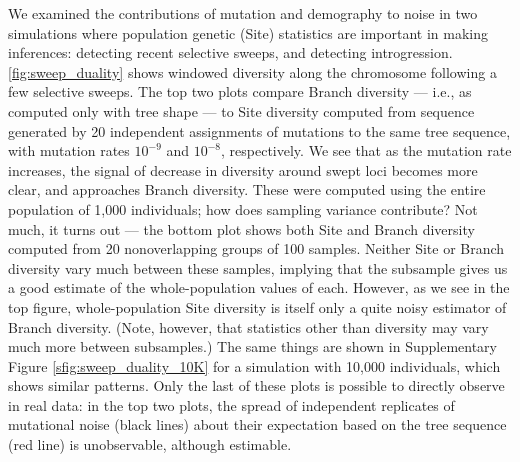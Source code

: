 \documentclass{article}
\begin{document}
We examined the contributions of mutation and demography to noise
in two simulations where population genetic (Site) statistics
are important in making inferences:
detecting recent selective sweeps,
and detecting introgression.
\autoref{fig:sweep_duality} shows windowed
diversity along the chromosome following a few selective sweeps.
The top two plots compare Branch diversity --- i.e., as computed only with tree shape ---
to Site diversity computed from sequence generated by 20 independent assignments of mutations to the same tree sequence,
with mutation rates $10^{-9}$ and $10^{-8}$, respectively.
We see that as the mutation rate increases, the signal of decrease in diversity around swept loci becomes more clear,
and approaches Branch diversity.
These were computed using the entire population of 1,000 individuals;
how does sampling variance contribute?
Not much, it turns out --- the bottom plot shows both Site and Branch diversity
computed from 20 nonoverlapping groups of 100 samples.
Neither Site or Branch diversity vary much between these samples,
implying that the subsample gives us a good estimate of the whole-population values of each.
However, as we see in the top figure,
whole-population Site diversity is itself only a quite noisy estimator of Branch diversity.
(Note, however, that statistics other than diversity may vary much more between subsamples.)
The same things are shown in Supplementary Figure \ref{sfig:sweep_duality_10K}
for a simulation with 10,000 individuals, which shows similar patterns.
Only the last of these plots is possible to directly observe in real data:
in the top two plots,
the spread of independent replicates of mutational noise (black lines)
about their expectation based on the tree sequence (red line)
is unobservable, although estimable.
\end{document}
